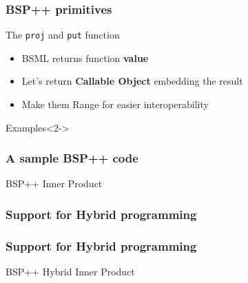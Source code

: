 \frame
{
  \frametitle{BSP++ primitives}
  \begin{block}{The \texttt{proj} and \texttt{put} function}
  \begin{itemize}
  \footnotesize
  \item BSML returns function \textbf{value}
  \item Let's return \textbf{Callable Object} embedding the result
  \item Make them Range for easier interoperability 
  \end{itemize} 
  \end{block}{}

  \begin{block}{Examples}<2->
  \end{block}{}
}

\frame
{
  \frametitle{A sample BSP++ code}
  \begin{block}{BSP++ Inner Product}
   \lstbspinnerproduct
  \end{block}{}
}

\frame
{
  \frametitle{Support for Hybrid programming}
  \begin{center}
  \end{center}
}

\frame
{
  \frametitle{Support for Hybrid programming}
  \begin{block}{BSP++ Hybrid Inner Product}
  \end{block}{}
}



